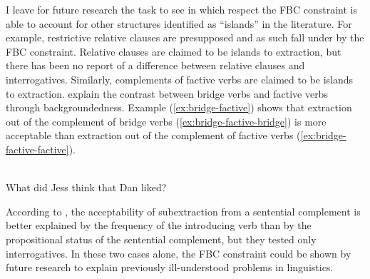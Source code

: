 
I leave for future research the task to see in which respect the FBC constraint is able to account for other structures identified as ``islands'' in the literature. For example, restrictive relative clauses are presupposed and as such fall under by the FBC constraint. Relative clauses are claimed to be islands to extraction, but there has been no report of a difference between relative clauses and interrogatives. Similarly, complements of factive verbs are claimed to be islands to extraction. \citet{Ambridge.2008} explain the contrast between bridge verbs and factive verbs through backgroundedness. Example (\ref{ex:bridge-factive}) shows that extraction out of the complement of bridge verbs (\ref{ex:bridge-factive-bridge}) is more acceptable than extraction out of the complement of factive verbs (\ref{ex:bridge-factive-factive}). 

\eal \label{ex:bridge-factive}
\ex \citep[371]{Ambridge.2008}\\
What did Jess think that Dan liked? \label{ex:bridge-factive-bridge}
\zl 

According to \citet{Liu.Y.2019}, the acceptability of subextraction from a sentential complement is better explained by the frequency of the introducing verb than by the propositional status of the sentential complement, but they tested only interrogatives. In these two cases alone, the FBC constraint could be shown by future research to explain previously ill-understood problems in linguistics.

